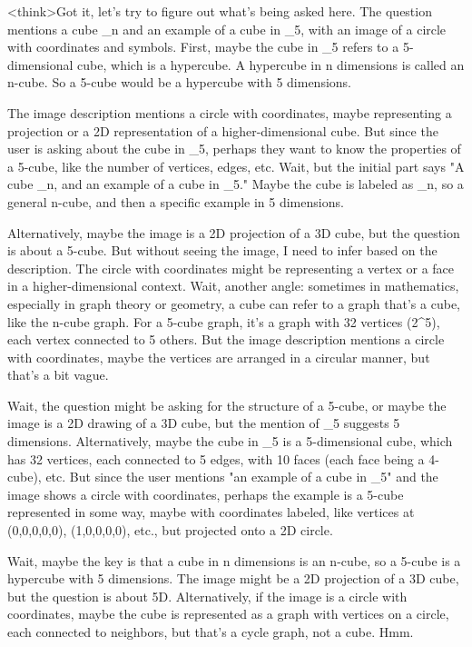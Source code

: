 <think>Got it, let's try to figure out what's being asked here. The question mentions a cube _n and an example of a cube in _5, with an image of a circle with coordinates and symbols. First, maybe the cube in _5 refers to a 5-dimensional cube, which is a hypercube. A hypercube in n dimensions is called an n-cube. So a 5-cube would be a hypercube with 5 dimensions. 

The image description mentions a circle with coordinates, maybe representing a projection or a 2D representation of a higher-dimensional cube. But since the user is asking about the cube in _5, perhaps they want to know the properties of a 5-cube, like the number of vertices, edges, etc. Wait, but the initial part says "A cube _n, and an example of a cube in _5." Maybe the cube is labeled as _n, so a general n-cube, and then a specific example in 5 dimensions. 

Alternatively, maybe the image is a 2D projection of a 3D cube, but the question is about a 5-cube. But without seeing the image, I need to infer based on the description. The circle with coordinates might be representing a vertex or a face in a higher-dimensional context. Wait, another angle: sometimes in mathematics, especially in graph theory or geometry, a cube can refer to a graph that's a cube, like the n-cube graph. For a 5-cube graph, it's a graph with 32 vertices (2^5), each vertex connected to 5 others. But the image description mentions a circle with coordinates, maybe the vertices are arranged in a circular manner, but that's a bit vague. 

Wait, the question might be asking for the structure of a 5-cube, or maybe the image is a 2D drawing of a 3D cube, but the mention of _5 suggests 5 dimensions. Alternatively, maybe the cube in _5 is a 5-dimensional cube, which has 32 vertices, each connected to 5 edges, with 10 faces (each face being a 4-cube), etc. But since the user mentions "an example of a cube in _5" and the image shows a circle with coordinates, perhaps the example is a 5-cube represented in some way, maybe with coordinates labeled, like vertices at (0,0,0,0,0), (1,0,0,0,0), etc., but projected onto a 2D circle. 

Wait, maybe the key is that a cube in n dimensions is an n-cube, so a 5-cube is a hypercube with 5 dimensions. The image might be a 2D projection of a 3D cube, but the question is about 5D. Alternatively, if the image is a circle with coordinates, maybe the cube is represented as a graph with vertices on a circle, each connected to neighbors, but that's a cycle graph, not a cube. Hmm. 

